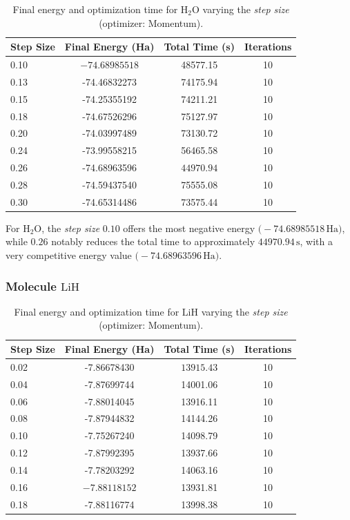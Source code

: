 \begin{table}[H]
\centering
\caption{Final energy and optimization time for \(\mathrm{H_2O}\) varying the \textit{step size} (optimizer: Momentum).}
\begin{tabular}{lccc}
\toprule
\textbf{Step Size} & \textbf{Final Energy (Ha)} & \textbf{Total Time (s)} & \textbf{Iterations} \\
\midrule
0.10 & \(\mathbf{-74.68985518}\) & 48577.15 & 10 \\
0.13 & -74.46832273 & 74175.94 & 10 \\
0.15 & -74.25355192 & 74211.21 & 10 \\
0.18 & -74.67526296 & 75127.97 & 10 \\
0.20 & -74.03997489 & 73130.72 & 10 \\
0.24 & -73.99558215 & 56465.58 & 10 \\
0.26 & -74.68963596 & \(\mathbf{44970.94}\) & 10 \\
0.28 & -74.59437540 & 75555.08 & 10 \\
0.30 & -74.65314486 & 73575.44 & 10 \\
\bottomrule
\end{tabular}
\end{table}

For \(\mathrm{H_2O}\), the \textit{step size} \(0.10\) offers the most negative energy \(\bigl(-74.68985518\,\mathrm{Ha}\bigr)\), while \(0.26\) notably reduces the total time to approximately \(44970.94\,\mathrm{s}\), with a very competitive energy value \(\bigl(-74.68963596\,\mathrm{Ha}\bigr)\).

\subsubsection{Molecule \(\mathrm{LiH}\)}

\begin{table}[H]
\centering
\caption{Final energy and optimization time for \(\mathrm{LiH}\) varying the \textit{step size} (optimizer: Momentum).}
\begin{tabular}{lccc}
\toprule
\textbf{Step Size} & \textbf{Final Energy (Ha)} & \textbf{Total Time (s)} & \textbf{Iterations} \\
\midrule
0.02 & -7.86678430 & \(\mathbf{13915.43}\) & 10 \\
0.04 & -7.87699744 & 14001.06 & 10 \\
0.06 & -7.88014045 & 13916.11 & 10 \\
0.08 & -7.87944832 & 14144.26 & 10 \\
0.10 & -7.75267240 & 14098.79 & 10 \\
0.12 & -7.87992395 & 13937.66 & 10 \\
0.14 & -7.78203292 & 14063.16 & 10 \\
0.16 & \(\mathbf{-7.88118152}\) & 13931.81 & 10 \\
0.18 & -7.88116774 & 13998.38 & 10 \\
\bottomrule
\end{tabular}
\end{table}

